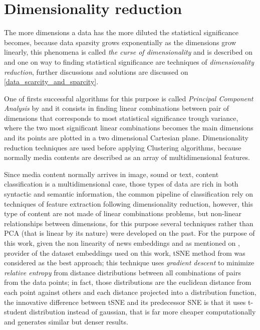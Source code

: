 \documentclass[ecp,tc,english]{iiufrgs}
\begin{document}
        \section{Dimensionality reduction} \label{dimensionality_reduction}
        The more dimensions a data has the more diluted the statistical significance becomes, 
        because data sparsity grows exponentially as the dimensions grow linearly,  
        this phenomena is called \textit{the curse of dimensionality} and is described on \cite{marimont1979} and one on way to finding statistical significance are techniques of \textit{dimensionality reduction}, further discussions and solutions are discussed on \ref{data_scarcity_and_sparcity}.
        
        One of firsts successful algorithms for this purpose is called \textit{Principal Component Analysis} 
        by \cite{hotelling1933} and it consists in finding linear combinations between pair of dimensions that corresponds to most statistical significance trough variance, where the two most significant linear combinations becomes the main dimensions and its points are plotted in a two dimensional Cartesian plane.
        Dimensionality reduction techniques are used before applying Clustering algorithms, because normally media contents are described as an array of multidimensional features.
        
        Since media content normally arrives in image, sound or text, content classification is a multidimensional case, those types of data are rich in both syntactic and semantic information, the common pipeline of classification rely on techniques of feature extraction following dimensionality reduction, however, this type of content are not made of linear combinations problems, but non-linear relationships between dimensions, for this purpose several techniques rather than PCA (that is linear by its nature) were developed on the past. For the purpose of this work, given the non linearity of news embeddings and as mentioned on \cite{moreira2018chameleon}, provider of the dataset embeddings used on this work, tSNE method from \cite{maaten2008} was considered as the best approach; this technique uses \textit{gradient descent} \cite{bryson1962} to minimize \textit{relative entropy} \cite{kullback1951} from distance distributions between all combinations of pairs from the data points; in fact, those distributions are the euclidean distance from each point against others and each distance projected into a distribution function, the innovative difference between tSNE and its predecessor SNE \cite{hinton2002} is that it uses t-student distribution instead of gaussian, that is far more cheaper computationally and generates similar but denser results.
        
\end{document}
